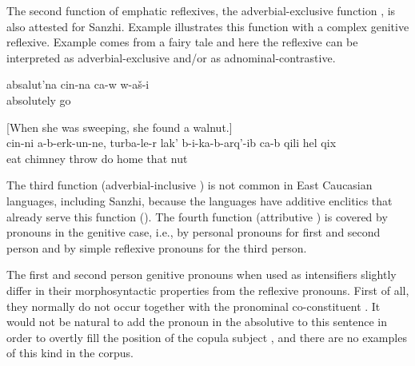 	
The second function of emphatic reflexives, the adverbial-exclusive function , is also attested for Sanzhi. Example  illustrates this function with a complex genitive reflexive. Example  comes from a fairy tale and here the reflexive can be interpreted as adverbial-exclusive and/or as adnominal-contrastive.
%
\begin{exe}
	\ex	\label{ex:He went completely on his own (alone)@15c}
	\gll	absalut'na	cin-na	ca-w	w-aš-i\\
		absolutely			go\\
	\glt	{}
	
	\ex	\label{ex:‎‎She did not eat the nut herself, but threw it through the chimney into the house@3a} [When she was sweeping, she found a walnut.]\\
	\gll	cin-ni	a-b-erk-un-ne,	turba-le-r	lak' 	b-i-ka-b-arq'-ib	ca-b	qili	hel	qix\\
			eat	chimney	throw	do		home	that	nut\\
	\glt	{}
\end{exe}

The third function (adverbial-inclusive ) is not common in East Caucasian languages, including Sanzhi, because the languages have additive enclitics that already serve this function (). The fourth function (attributive ) is covered by pronouns in the genitive case, i.e., by personal pronouns for first and second person and by simple reflexive pronouns for the third person. 

The first and second person genitive pronouns when used as intensifiers slightly differ in their morphosyntactic properties from the reflexive pronouns. First of all, they normally do not occur together with the pronominal co-constituent . It would not be natural to add the pronoun in the absolutive to this sentence in order to overtly fill the position of the copula subject , and there are no examples of this kind in the corpus.
%

